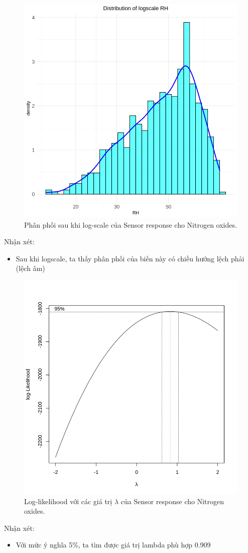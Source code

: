 \begin{figure}[H]
    \centering
    \includegraphics[width=0.75\columnwidth]{air_figures/RH_logscale_distribution.png}
    \caption{Phân phối sau khi log-scale của Sensor response cho Nitrogen oxides.}
    \label{fig:rh_logscale_distribution}
\end{figure}
Nhận xét:
\begin{itemize}
    \item Sau khi logscale, ta thấy phân phối của biến này có chiều hướng lệch phải (lệch âm)
\end{itemize}

\begin{figure}[H]
    \centering
    \includegraphics[width=0.75\columnwidth]{air_figures/RH_optimal_lambda.png}
    \caption{Log-likelihood với các giá trị $\lambda$ của Sensor response cho Nitrogen oxides.}
    \label{fig:rh_optimal_lambda}
\end{figure}
Nhận xét:
\begin{itemize}
    \item Với mức ý nghĩa 5\%, ta tìm được giá trị lambda phù hợp 0.909
\end{itemize}

